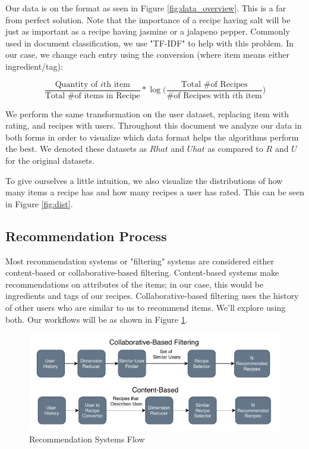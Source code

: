 \documentclass[11pt]{article}
\newcommand*\textfrac[2]{
  \frac{\text{#1}}{\text{#2}}
}
\begin{document}
Our data is on the format as seen in Figure \ref{fig:data_overview}. This is a far from perfect solution. Note that the importance of a recipe having salt will be just as important as a recipe having jasmine or a jalapeno pepper. Commonly used in document classification, we use "TF-IDF" to help with this problem. In our case, we change each entry using the conversion (where item means either ingredient/tag):

$$\textfrac{Quantity of $i$th item}{Total \# of items in Recipe} * \log \Big( \textfrac{Total \# of Recipes}{\# of Recipes with $i$th item} \Big)$$

We perform the same transformation on the user dataset, replacing item with rating, and recipes with users. Throughout this document we analyze our data in both forms in order to visualize which data format helps the algorithms perform the best. We denoted these datasets as $Rhat$ and $Uhat$ as compared to $R$ and $U$ for the original datasets.

To give ourselves a little intuition, we also visualize the distributions of how many items a recipe has and how many recipes a user has rated. This can be seen in Figure \ref{fig:dist}.


\subsection{Recommendation Process}
Most recommendation systems or "filtering" systems are considered either content-based or collaborative-based filtering. Content-based systems make recommendations on attributes of the items; in our case, this would be ingredients and tags of our recipes. Collaborative-based filtering uses the history of other users who are similar to us to recommend items. We'll explore using both. Our workflows will be as shown in Figure \ref{fig:flow}.

\begin{figure}[t]
\centering
\includegraphics[width=1\textwidth]{figs/flow.pdf}
\caption{Recommendation Systems Flow}
\label{fig:flow}
\end{figure}
\end{document}
